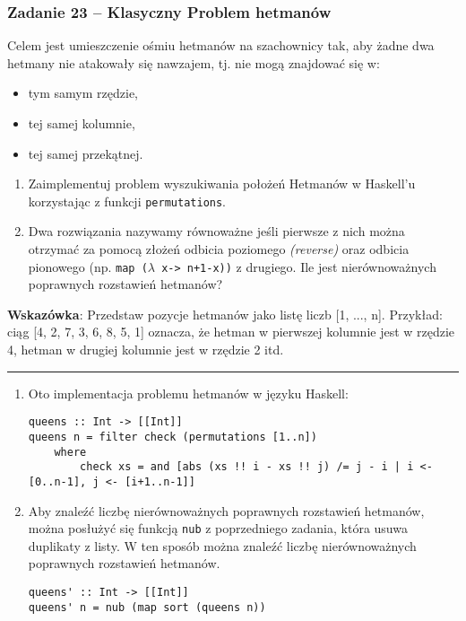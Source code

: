 \documentclass[11pt,a4paper]{article}
\begin{document}
\subsubsection{Zadanie 23 -- Klasyczny Problem hetmanów}
Celem jest umieszczenie ośmiu hetmanów na szachownicy tak, aby żadne dwa hetmany nie atakowały się nawzajem, tj. nie mogą znajdować się w:
\begin{itemize}
    \item tym samym rzędzie,
    \item tej samej kolumnie,
    \item tej samej przekątnej.
\end{itemize}
\begin{enumerate}
    \item Zaimplementuj problem wyszukiwania położeń Hetmanów w Haskell’u korzystając z funkcji \texttt{permutations}.
    \item Dwa rozwiązania nazywamy równoważne jeśli pierwsze z nich można otrzymać za pomocą złożeń odbicia poziomego \textit{(reverse)} oraz odbicia pionowego (np. \texttt{map ($\lambda$ x-> n+1-x))} z drugiego. Ile jest nierównoważnych poprawnych rozstawień hetmanów?
\end{enumerate}
\textbf{Wskazówka}: Przedstaw pozycje hetmanów jako listę liczb [1, ..., n]. Przykład: ciąg [4, 2, 7, 3, 6, 8, 5, 1] oznacza, że hetman w pierwszej kolumnie jest w rzędzie 4, hetman w drugiej kolumnie jest w rzędzie 2 itd.

\bigskip
\hrule
\bigskip

\begin{enumerate}
    \item Oto implementacja problemu hetmanów w języku Haskell:
        \begin{Verbatim}[frame=single]
queens :: Int -> [[Int]]
queens n = filter check (permutations [1..n])
    where
        check xs = and [abs (xs !! i - xs !! j) /= j - i | i <- [0..n-1], j <- [i+1..n-1]]
        \end{Verbatim}
    \item Aby znaleźć liczbę nierównoważnych poprawnych rozstawień hetmanów, można posłużyć się funkcją \texttt{nub} z poprzedniego zadania, która usuwa duplikaty z listy. W ten sposób można znaleźć liczbę nierównoważnych poprawnych rozstawień hetmanów.
        \begin{Verbatim}[frame=single]
queens' :: Int -> [[Int]]
queens' n = nub (map sort (queens n))
        \end{Verbatim}
\end{enumerate}
\end{document}
